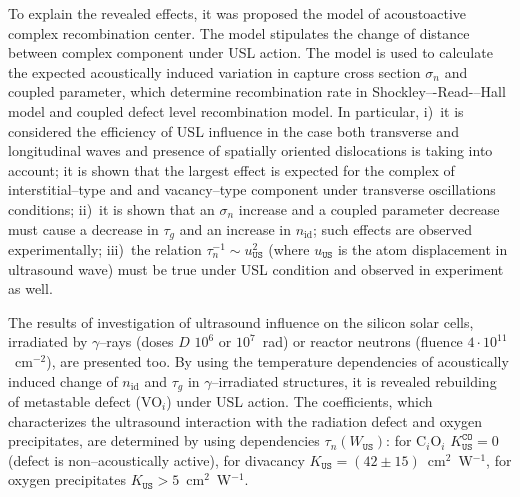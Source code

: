To explain the revealed effects, it was proposed the model of acoustoactive complex recombination center.
The model stipulates the change of distance between complex component under USL action.
The model is used to calculate the expected acoustically induced variation in capture cross section $\sigma_{n}$ and coupled parameter, which determine recombination rate in Shockley–-Read-–Hall model and coupled defect level recombination model.
In particular,
i)~it is considered the efficiency of USL influence in the case both transverse and longitudinal waves and presence of spatially oriented dislocations is taking into account;
it is shown that the largest effect is expected for the complex of interstitial--type and and vacancy--type component under transverse oscillations conditions;
ii)~it is shown that an $\sigma_{n}$ increase and a coupled parameter decrease must cause a decrease in $\tau_g$ and an increase in $n_\mathrm{id}$; such effects are observed experimentally;
iii)~the relation $\tau_{n}^{-1}\sim u_{\mathtt{US}}^2$
(where $u_\mathtt{US}$ is the atom displacement in ultrasound wave)
must be true under USL condition and observed in experiment as well.




The results of investigation of ultrasound influence on the silicon solar cells,
irradiated by $\gamma$--rays (doses $D$ $10^6$ or $10^7$~rad) or reactor neutrons (fluence $4\cdot10^{11}$~cm$^{-2}$),
are presented too.
By using the temperature dependencies of acoustically induced change of $n_\mathrm{id}$ and $\tau_{g}$ in $\gamma$--irradiated structures, it is revealed rebuilding of metastable defect (VO$_i$) under USL action.
The coefficients, which characterizes the ultrasound interaction with the radiation defect and oxygen precipitates,  are determined by using dependencies $\tau_n(W_\mathtt{US})$:
for C$_i$O$_i$ $K_\mathtt{US}^\mathtt{CO}=0$ (defect is non--acoustically active),
for divacancy $K_\mathtt{US}=(42\pm15)$~cm$^2$~W$^{-1}$,
for oxygen precipitates $K_\mathtt{US}>5$~cm$^2$~W$^{-1}$.


